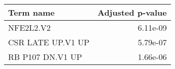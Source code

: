 \begin{tabular}{lr}
\toprule
        Term name &  Adjusted p-value \\
\midrule
        NFE2L2.V2 &          6.11e-09 \\
CSR LATE UP.V1 UP &          5.79e-07 \\
 RB P107 DN.V1 UP &          1.66e-06 \\
\bottomrule
\end{tabular}
